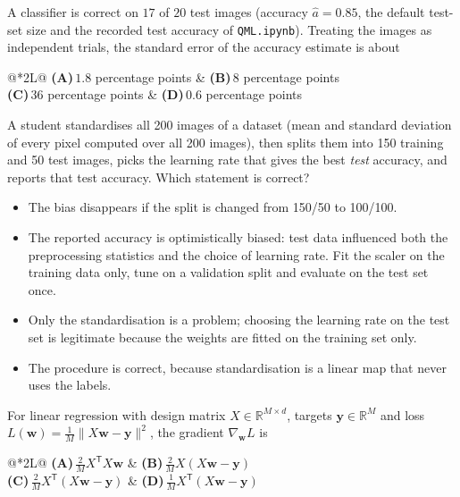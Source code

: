 \documentclass[11pt,a4paper]{article}
\newcommand{\optlabel}[1]{\textbf{(#1)}}
\newenvironment{qitem}[1]{\begin{list}{}{\setlength{\leftmargin}{3.3em}\setlength{\labelwidth}{3.1em}%
  \setlength{\labelsep}{0.2em}\setlength{\topsep}{3pt}\setlength{\parsep}{3pt}}\item[\textbf{Q.#1}\hfill]}{\end{list}}
\newcommand{\qsep}{\par\vspace{2pt}{\color{black!15}\hrule}\vspace{4pt}}
\begin{document}
\begin{qitem}{11}
A classifier is correct on $17$ of $20$ test images (accuracy $\hat a = 0.85$, the default test-set size and the
recorded test accuracy of \texttt{QML.ipynb}). Treating the images as independent trials, the standard error of the
accuracy estimate is about
\par\smallskip\noindent\begin{tabularx}{\linewidth}{@{}*{2}{L}@{}}
\optlabel{A}\,$1.8$ percentage points & \optlabel{B}\,$8$ percentage points \\[3pt]
\optlabel{C}\,$36$ percentage points & \optlabel{D}\,$0.6$ percentage points
\end{tabularx}
\end{qitem}
\qsep

\begin{qitem}{12}
A student standardises all 200 images of a dataset (mean and standard deviation of every pixel computed over all
200 images), then splits them into 150 training and 50 test images, picks the learning rate that gives the best
\emph{test} accuracy, and reports that test accuracy. Which statement is correct?
\begin{itemize}[leftmargin=2.6em, labelsep=0.4em, itemsep=2pt, topsep=3pt]
\item[\optlabel{A}] The bias disappears if the split is changed from 150/50 to 100/100.
\item[\optlabel{B}] The reported accuracy is optimistically biased: test data influenced both the preprocessing statistics and the choice of learning rate. Fit the scaler on the training data only, tune on a validation split and evaluate on the test set once.
\item[\optlabel{C}] Only the standardisation is a problem; choosing the learning rate on the test set is legitimate because the weights are fitted on the training set only.
\item[\optlabel{D}] The procedure is correct, because standardisation is a linear map that never uses the labels.
\end{itemize}
\end{qitem}
\qsep

\begin{qitem}{13}
For linear regression with design matrix $X \in \mathbb R^{M\times d}$, targets $\mathbf y \in \mathbb R^M$ and
loss $L(\mathbf w) = \frac1M\|X\mathbf w - \mathbf y\|^2$, the gradient $\nabla_{\mathbf w}L$ is
\par\smallskip\noindent\begin{tabularx}{\linewidth}{@{}*{2}{L}@{}}
\optlabel{A}\,$\frac2M X^{\mathsf T}X\mathbf w$ & \optlabel{B}\,$\frac2M X(X\mathbf w - \mathbf y)$ \\[3pt]
\optlabel{C}\,$\frac2M X^{\mathsf T}(X\mathbf w - \mathbf y)$ & \optlabel{D}\,$\frac1M X^{\mathsf T}(X\mathbf w - \mathbf y)$
\end{tabularx}
\end{qitem}
\qsep
\end{document}
